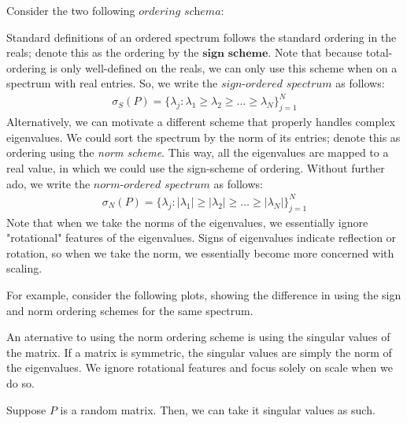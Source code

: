 
\noindent Consider the two following $\textit{ordering schema}$:

Standard definitions of an ordered spectrum follows the standard ordering in the reals; denote this as the ordering by the $\textbf{sign scheme}$. Note that because total-ordering is only well-defined on the reals, we can only use this scheme when on a spectrum with real entries. So, we write the $\textit{sign-ordered spectrum}$ as follows:
\begin{align*}
\sigma_S(P) = \{\lambda_j : \lambda_1 \geq \lambda_2 \geq \dots \geq \lambda_N\}_{j = 1}^N
\end{align*}
Alternatively, we can motivate a different scheme that properly handles complex eigenvalues. We could sort the spectrum by the norm of its entries; denote this as ordering using the \textit{norm scheme}. This way, all the eigenvalues are mapped to a real value, in which we could use the sign-scheme of ordering. Without further ado, we write the $\textit{norm-ordered spectrum}$ as follows:
\begin{align*}
\sigma_N(P) = \{\lambda_j : |\lambda_1| \geq |\lambda_2| \geq \dots \geq |\lambda_N|\}_{j = 1}^N
\end{align*}
Note that when we take the norms of the eigenvalues, we essentially ignore "rotational" features of the eigenvalues. Signs of eigenvalues indicate reflection or rotation, so when we take the norm, we essentially become more concerned with scaling.

For example, consider the following plots, showing the difference in using the sign and norm ordering schemes for the same spectrum.


\newpage
{}

An aternative to using the norm ordering scheme is using the singular values of the matrix. If a matrix is symmetric, the singular values are simply the norm of the eigenvalues. We ignore rotational features and focus solely on scale when we do so.

Suppose $P$ is a random matrix. Then, we can take it singular values as such.

